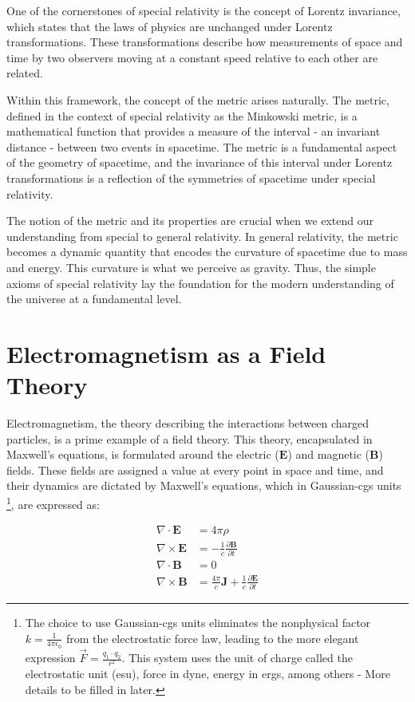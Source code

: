 One of the cornerstones of special relativity is the concept of Lorentz invariance, which states that the laws of physics are unchanged under Lorentz transformations. These transformations describe how measurements of space and time by two observers moving at a constant speed relative to each other are related.

Within this framework, the concept of the metric arises naturally. The metric, defined in the context of special relativity as the Minkowski metric, is a mathematical function that provides a measure of the interval - an invariant distance - between two events in spacetime. The metric is a fundamental aspect of the geometry of spacetime, and the invariance of this interval under Lorentz transformations is a reflection of the symmetries of spacetime under special relativity.

The notion of the metric and its properties are crucial when we extend our understanding from special to general relativity. In general relativity, the metric becomes a dynamic quantity that encodes the curvature of spacetime due to mass and energy. This curvature is what we perceive as gravity. Thus, the simple axioms of special relativity lay the foundation for the modern understanding of the universe at a fundamental level.




\section{Electromagnetism as a Field Theory}

Electromagnetism, the theory describing the interactions between charged particles, is a prime example of a field theory. This theory, encapsulated in Maxwell's equations, is formulated around the electric ($\mathbf{E}$) and magnetic ($\mathbf{B}$) fields. These fields are assigned a value at every point in space and time, and their dynamics are dictated by Maxwell's equations, which in Gaussian-cgs units \footnote{The choice to use Gaussian-cgs units eliminates the nonphysical factor $k=\frac{1}{4\pi \epsilon_0}$ from the electrostatic force law, leading to the more elegant expression $\Vec{F} = \frac{q_1 \cdot q_2}{r^2}$. This system uses the unit of charge called the electrostatic unit (esu), force in dyne, energy in ergs, among others - More details to be filled in later.}, are expressed as:

\begin{align}\label{eq:Maxwells}
    \nabla \cdot \mathbf{E} &= 4\pi\rho \\
    \nabla \times \mathbf{E} &= -\frac{1}{c} \frac{\partial \mathbf{B}}{\partial t}\label{eq:Maxwell grad E} \\
    \nabla \cdot \mathbf{B} &= 0 \\
    \nabla \times \mathbf{B} &= \frac{4\pi}{c} \mathbf{J} + \frac{1}{c} \frac{\partial \mathbf{E}}{\partial t}\label{eq:Maxwell Partial E}
\end{align}

